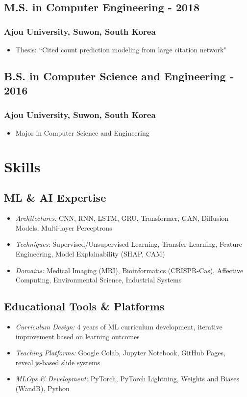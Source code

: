 \documentclass[11pt]{article}
\begin{document}
\subsection{M.S. in Computer Engineering\hfill {} - 2018}
\subsubsection{Ajou University, Suwon, South Korea}
\begin{itemize}
    \item[\checkmark] Thesis: ``Cited count prediction modeling from large citation network"
\end{itemize}

\subsection{B.S. in Computer Science and Engineering\hfill {} - 2016}
\subsubsection{Ajou University, Suwon, South Korea}
\begin{itemize}
    \item[\checkmark] Major in Computer Science and Engineering
\end{itemize}

\section{Skills}
\subsection{ML \& AI Expertise}
\begin{itemize}
    \item[\checkmark] \textit{Architectures:} CNN, RNN, LSTM, GRU, Transformer, GAN, Diffusion Models, Multi-layer Perceptrons
    \item[\checkmark] \textit{Techniques:} Supervised/Unsupervised Learning, Transfer Learning, Feature Engineering, Model Explainability (SHAP, CAM)
    \item[\checkmark] \textit{Domains:} Medical Imaging (MRI), Bioinformatics (CRISPR-Cas), Affective Computing, Environmental Science, Industrial Systems
\end{itemize}
\subsection{Educational Tools \& Platforms}
\begin{itemize}
    \item[\checkmark] \textit{Curriculum Design:} 4 years of ML curriculum development, iterative improvement based on learning outcomes
    \item[\checkmark] \textit{Teaching Platforms:} Google Colab, Jupyter Notebook, GitHub Pages, reveal.js-based slide systems
    \item[\checkmark] \textit{MLOps \& Development:} PyTorch, PyTorch Lightning, Weights and Biases (WandB), Python
\end{itemize}
\end{document}
